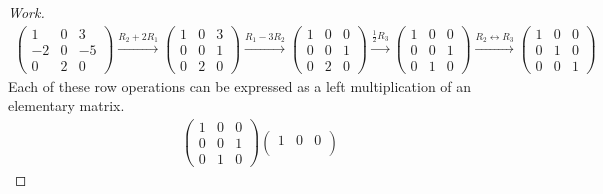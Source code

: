 \documentclass{article}
\begin{document}
\begin{proof}[Work]
    \begin{align*}
        \begin{pmatrix}
            1  & 0 & 3  \\
            -2 & 0 & -5 \\
            0  & 2 & 0
        \end{pmatrix} \xrightarrow{R_2 + 2R_1}
        \begin{pmatrix}
            1 & 0 & 3 \\
            0 & 0 & 1 \\
            0 & 2 & 0
        \end{pmatrix} \xrightarrow{R_1 - 3R_2}
        \begin{pmatrix}
            1 & 0 & 0 \\
            0 & 0 & 1 \\
            0 & 2 & 0
        \end{pmatrix} \xrightarrow{\frac{1}{2}R_3}
        \begin{pmatrix}
            1 & 0 & 0 \\
            0 & 0 & 1 \\
            0 & 1 & 0
        \end{pmatrix} \xrightarrow{R_2 \leftrightarrow R_3}
        \begin{pmatrix}
            1 & 0 & 0 \\
            0 & 1 & 0 \\
            0 & 0 & 1
        \end{pmatrix}
    \end{align*}
    Each of these row operations can be expressed as a left multiplication of an elementary matrix.
    \begin{align*}
        \begin{pmatrix}
            1 & 0 & 0 \\
            0 & 0 & 1 \\
            0 & 1 & 0
        \end{pmatrix}
        \begin{pmatrix}
            1 & 0 & 0           \\

\end{pmatrix}
\end{align*}
\end{proof}
\end{document}
